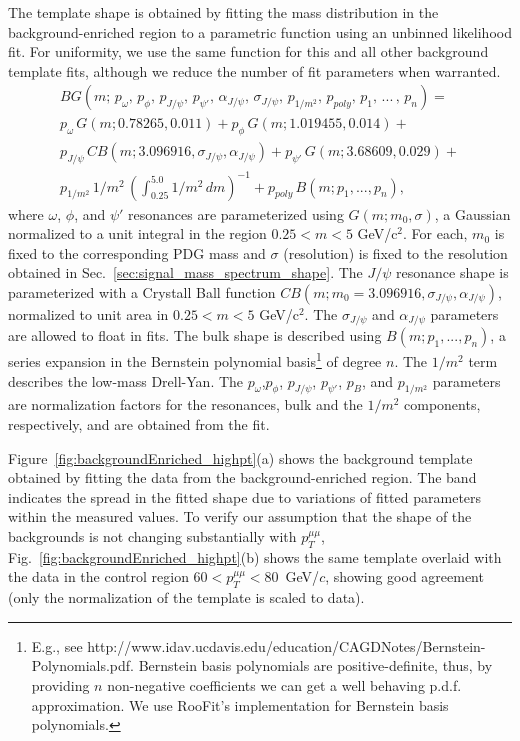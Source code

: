 The template shape is obtained by fitting the mass distribution in the background-enriched region to a parametric
function using an unbinned likelihood fit. For uniformity, we use the same function for this and all other background template fits, although we reduce the number of fit parameters when warranted.
\begin{multline}
BG(m;\, p_\omega,\, p_\phi,\, p_{J/\psi},\, p_{\psi'},\, \alpha_{J/\psi},\, \sigma_{J/\psi},\, p_{1/m^2},\, p_{poly},\, p_1,\, ...\,,\, p_n) = \\
p_\omega \, G(m; 0.78265, 0.011) + p_\phi \, G(m; 1.019455, 0.014) + \\
p_{J/\psi} \, CB(m; 3.096916, \sigma_{J/\psi}, \alpha_{J/\psi}) + p_{\psi'} \, G(m; 3.68609, 0.029) + \\
p_{1/m^2} \, 1/m^2 \, ( \int_{0.25}^{5.0}{1/m^2\, dm} )^{-1} + p_{poly} \, B(m; p_1, ..., p_n),
\label{eqn:bkg_shape}
\end{multline}
where $\omega$, $\phi$, and $\psi'$ resonances are parameterized using
$G(m; m_0, \sigma)$, a Gaussian normalized to a unit integral in the
region $0.25 < m < 5$ GeV/c$^2$. For each, $m_0$ is fixed to the
corresponding PDG mass and $\sigma$ (resolution) is fixed to the
resolution obtained in Sec.~\ref{sec:signal_mass_spectrum_shape}. The
$J/\psi$ resonance shape is parameterized with a Crystall Ball
function $CB(m; m_0=3.096916, \sigma_{J/\psi}, \alpha_{J/\psi})$,
normalized to unit area in $0.25 < m < 5$ GeV/c$^2$.  The
$\sigma_{J/\psi}$ and $\alpha_{J/\psi}$ parameters are allowed to
float in fits. The bulk shape is described using $B(m; p_1, ...,
p_n)$, a series expansion in the Bernstein polynomial basis\footnote{E.g.,
  see
  http://www.idav.ucdavis.edu/education/CAGDNotes/Bernstein-Polynomials.pdf. Bernstein
  basis polynomials are positive-definite, thus, by providing $n$
  non-negative coefficients we can get a well behaving
  p.d.f. approximation. We use RooFit's implementation for Bernstein
  basis polynomials.} of degree $n$. The $1/m^2$ term describes the
low-mass Drell-Yan. The $p_\omega$,$p_\phi$, $p_{J/\psi}$, $p_{\psi'}$,
$p_{B}$, and $p_{1/m^2}$ parameters are normalization factors for the
resonances, bulk and the $1/m^2$ components, respectively, and are
obtained from the fit.

Figure~\ref{fig:backgroundEnriched_highpt}(a) shows the background
template obtained by fitting the data from the background-enriched
region. The band indicates the spread in the fitted shape due to
variations of fitted parameters within the measured values. To verify
our assumption that the shape of the backgrounds is not changing
substantially with $p_T^{\mu\mu}$,
Fig.~\ref{fig:backgroundEnriched_highpt}(b) shows the same template
overlaid with the data in the control region $60 < p_T^{\mu\mu} <
80$~GeV/$c$, showing good agreement (only the normalization of the template is scaled to data).

